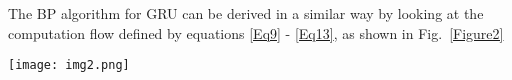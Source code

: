 \documentclass[journal]{IEEEtran}
\begin{document}
\begin{comment}For the different loss function, the BP through time on the recurrent networks may be slightly different, but the fundamental derivative backpropagation is the same. All the loss functions proposed are a combination (summation) on the basic simple loss at a time, see \eqref{Eq14}. Here we will derive the BP algorithm for the loss $l_t$ at a particular time $t_0$. We shall also note that the output at time $t_0$, $\widehat{\mathcal{O}}_{t_0}$, is actually calculated through a normal tensor layer from the hidden tensor $\mathcal{H}_{t_0}$ which itself is calculated from the inputs $\{\mathcal{X}_t\}^{t_0}_{t=1}$ and $\mathcal{H}_0$ as well as $\mathcal{C}_0$ (for LSTM network). We will assume $\mathcal{H}_0=0$ and $\mathcal{C}_0=0$ It is easy to calculate the overall derivative $\frac{\partial l_t}{\partial \mathcal{H}_t}$, see \cite{BaiZhangGao2017,ChienBao2017}. For the sake of convenience, we assume this information is available and can be backpropagated to the LSTM and GRU structures, respectively.
\end{comment}

The BP algorithm for GRU can be derived in a similar way by looking at the  computation flow defined by equations \eqref{Eq9} - \eqref{Eq13}, as shown in Fig.~\ref{Figure2}
\begin{figure*}[!h]
\centering
\texttt{[image: img2.png]}
\caption{GRU Computation Flow. 
}
\label{Figure2}
\end{figure*}
\end{document}
